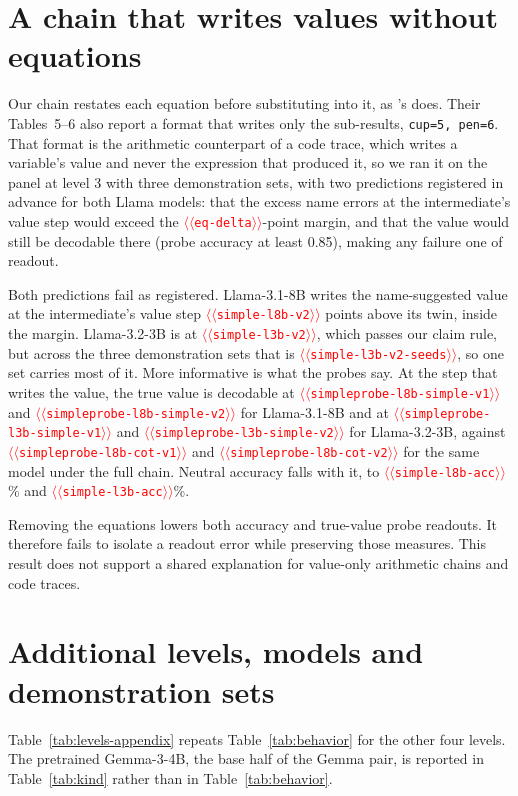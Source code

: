 \documentclass[11pt]{article}
\providecommand{\NUM}[1]{\textcolor{red}{$\langle\langle$\texttt{#1}$\rangle\rangle$}}
\begin{document}
\section{A chain that writes values without equations}
\label{app:simple}

Our chain restates each equation before substituting into it, as
\citeauthor{kudo2026faithful}'s does. Their Tables~5--6 also report a format that writes only the
sub-results, \texttt{cup=5, pen=6}. That format is the arithmetic counterpart of a code trace,
which writes a variable's value and never the expression that produced it, so we ran it on the
panel at level 3 with three demonstration sets, with two predictions registered in advance for both Llama models: that
the excess name errors at the intermediate's value step would exceed the \NUM{eq-delta}-point
margin, and that the value would still be decodable there (probe accuracy at least 0.85), making
any failure one of readout.

Both predictions fail as registered. Llama-3.1-8B writes the name-suggested value at the intermediate's value
step \NUM{simple-l8b-v2} points above its twin, inside the margin. Llama-3.2-3B is at
\NUM{simple-l3b-v2}, which passes our claim rule, but across the three demonstration sets that
is \NUM{simple-l3b-v2-seeds}, so one set carries most of it. More informative is what the probes say. At
the step that writes the value, the true value is decodable at \NUM{simpleprobe-l8b-simple-v1}
and \NUM{simpleprobe-l8b-simple-v2} for Llama-3.1-8B and at
\NUM{simpleprobe-l3b-simple-v1} and \NUM{simpleprobe-l3b-simple-v2} for Llama-3.2-3B, against
\NUM{simpleprobe-l8b-cot-v1} and \NUM{simpleprobe-l8b-cot-v2} for the same model under the full
chain. Neutral accuracy falls with it, to \NUM{simple-l8b-acc}\% and \NUM{simple-l3b-acc}\%.

Removing the equations lowers both accuracy and true-value probe readouts. It therefore fails to isolate a readout error while preserving those measures. This result does not support a shared explanation for value-only arithmetic chains and code traces.

\section{Additional levels, models and demonstration sets}
Table~\ref{tab:levels-appendix} repeats Table~\ref{tab:behavior} for the other four levels.
The pretrained Gemma-3-4B, the base half of the Gemma pair, is reported in
Table~\ref{tab:kind} rather than in Table~\ref{tab:behavior}.
\end{document}
